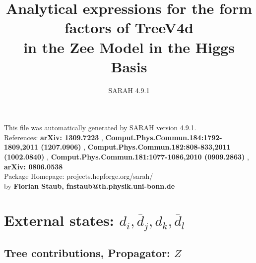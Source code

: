 \documentclass[A4,landscape]{article}
\begin{document}
\title{Analytical expressions for the form factors of TreeV4d\\ in the Zee Model in the Higgs Basis } 
 \author{SARAH 4.9.1} 
 \maketitle 
 \vspace{10cm} 
This file was automatically generated by SARAH version 4.9.1.  \\ 
References: {\bf arXiv: 1309.7223 }, {\bf Comput.Phys.Commun.184:1792-1809,2011 (1207.0906) }, {\bf Comput.Phys.Commun.182:808-833,2011 (1002.0840) }, {\bf Comput.Phys.Commun.181:1077-1086,2010 (0909.2863) }, {\bf arXiv: 0806.0538 } \\ 
Package Homepage: projects.hepforge.org/sarah/ \\ 
by {\bf Florian Staub, fnstaub@th.physik.uni-bonn.de} 
 \pagebreak 
 \tableofcontents 
 \pagebreak 
\section{External states: ${d_{{i}}, \bar{d}_{{j}}, d_{{k}}, \bar{d}_{{l}}}$} 
\subsection{Tree contributions, Propagator: $Z$} 
\end{document}

